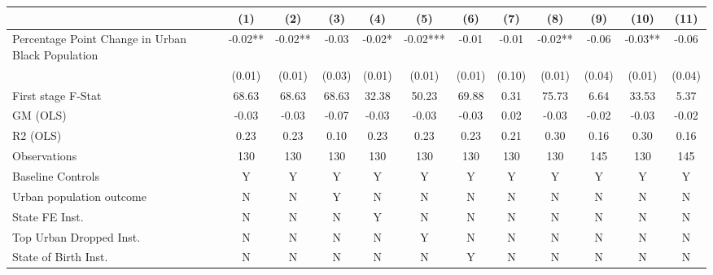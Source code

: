  \begin{tabular}{l*{11}{c}} \toprule
                    &\multicolumn{1}{c}{(1)}   &\multicolumn{1}{c}{(2)}   &\multicolumn{1}{c}{(3)}   &\multicolumn{1}{c}{(4)}   &\multicolumn{1}{c}{(5)}   &\multicolumn{1}{c}{(6)}   &\multicolumn{1}{c}{(7)}   &\multicolumn{1}{c}{(8)}   &\multicolumn{1}{c}{(9)}   &\multicolumn{1}{c}{(10)}   &\multicolumn{1}{c}{(11)}   \\
\midrule
Percentage Point Change in Urban Black Population&    -0.02** &    -0.02** &    -0.03   &    -0.02*  &    -0.02***&    -0.01   &    -0.01   &    -0.02** &    -0.06   &    -0.03** &    -0.06   \\
                    &   (0.01)   &   (0.01)   &   (0.03)   &   (0.01)   &   (0.01)   &   (0.01)   &   (0.10)   &   (0.01)   &   (0.04)   &   (0.01)   &   (0.04)   \\
\midrule
First stage F-Stat  &    68.63   &    68.63   &    68.63   &    32.38   &    50.23   &    69.88   &     0.31   &    75.73   &     6.64   &    33.53   &     5.37   \\
GM (OLS)            &    -0.03   &    -0.03   &    -0.07   &    -0.03   &    -0.03   &    -0.03   &     0.02   &    -0.03   &    -0.02   &    -0.03   &    -0.02   \\
R2 (OLS)            &     0.23   &     0.23   &     0.10   &     0.23   &     0.23   &     0.23   &     0.21   &     0.30   &     0.16   &     0.30   &     0.16   \\
Observations        &      130   &      130   &      130   &      130   &      130   &      130   &      130   &      130   &      145   &      130   &      145   \\
Baseline Controls   &        Y   &        Y   &        Y   &        Y   &        Y   &        Y   &        Y   &        Y   &        Y   &        Y   &        Y   \\
Urban population outcome&        N   &        N   &        Y   &        N   &        N   &        N   &        N   &        N   &        N   &        N   &        N   \\
State FE Inst.      &        N   &        N   &        N   &        Y   &        N   &        N   &        N   &        N   &        N   &        N   &        N   \\
Top Urban Dropped Inst.&        N   &        N   &        N   &        N   &        Y   &        N   &        N   &        N   &        N   &        N   &        N   \\
State of Birth Inst.&        N   &        N   &        N   &        N   &        N   &        Y   &        N   &        N   &        N   &        N   &        N   \\

\end{tabular}
